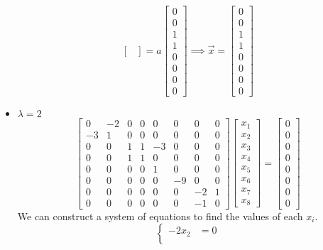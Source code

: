 \documentclass{report}
\begin{document}
\begin{itemize}
$$\begin{bmatrix}
\end{bmatrix} =
a\begin{bmatrix}
0 \\ 0 \\ 1 \\ 1 \\ 0 \\ 0 \\ 0 \\ 0
\end{bmatrix} \implies
\vec{x} = \begin{bmatrix}
0 \\ 0 \\ 1 \\ 1 \\ 0 \\ 0 \\ 0 \\ 0
\end{bmatrix}
$$ 
\item $\lambda = 2$
$$
\begin{bmatrix}
0&-2&0&0&0&0&0&0\\
-3&1&0&0&0&0&0&0\\
0&0&1&1&-3&0&0&0\\
0&0&1&1&0&0&0&0\\
0&0&0&0&1&0&0&0\\
0&0&0&0&0&-9&0&0\\
0&0&0&0&0&0&-2&1\\
0&0&0&0&0&0&-1&0
\end{bmatrix}
\begin{bmatrix}
x_1 \\ x_2 \\ x_3 \\ x_4 \\ x_5 \\ x_6 \\ x_7 \\ x_8
\end{bmatrix} = \begin{bmatrix}
0 \\ 0 \\ 0 \\ 0 \\ 0 \\ 0 \\ 0 \\ 0
\end{bmatrix}
$$
We can construct a system of equations to find the values of each $x_i$.
$$
\left\{
\begin{aligned}
-2x_2 & = 0 \\

\end{aligned}$$
\end{itemize}
\end{document}
